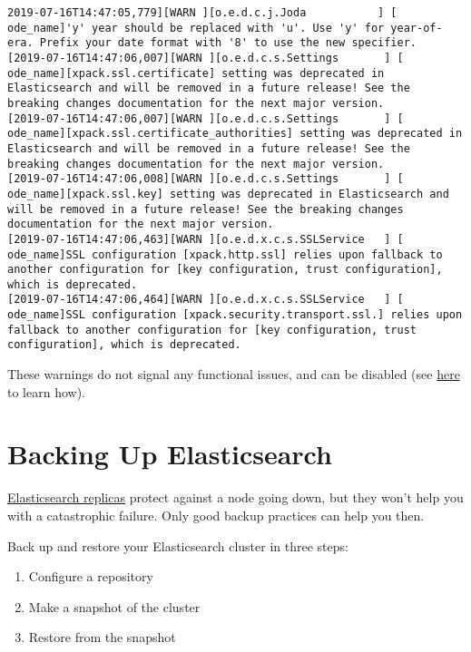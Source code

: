 \begin{verbatim}
2019-07-16T14:47:05,779][WARN ][o.e.d.c.j.Joda           ] [
ode_name]'y' year should be replaced with 'u'. Use 'y' for year-of-era. Prefix your date format with '8' to use the new specifier.
[2019-07-16T14:47:06,007][WARN ][o.e.d.c.s.Settings       ] [
ode_name][xpack.ssl.certificate] setting was deprecated in Elasticsearch and will be removed in a future release! See the breaking changes documentation for the next major version.
[2019-07-16T14:47:06,007][WARN ][o.e.d.c.s.Settings       ] [
ode_name][xpack.ssl.certificate_authorities] setting was deprecated in Elasticsearch and will be removed in a future release! See the breaking changes documentation for the next major version.
[2019-07-16T14:47:06,008][WARN ][o.e.d.c.s.Settings       ] [
ode_name][xpack.ssl.key] setting was deprecated in Elasticsearch and will be removed in a future release! See the breaking changes documentation for the next major version.
[2019-07-16T14:47:06,463][WARN ][o.e.d.x.c.s.SSLService   ] [
ode_name]SSL configuration [xpack.http.ssl] relies upon fallback to another configuration for [key configuration, trust configuration], which is deprecated.
[2019-07-16T14:47:06,464][WARN ][o.e.d.x.c.s.SSLService   ] [
ode_name]SSL configuration [xpack.security.transport.ssl.] relies upon fallback to another configuration for [key configuration, trust configuration], which is deprecated.
\end{verbatim}

These warnings do not signal any functional issues, and can be disabled
(see
\href{https://www.elastic.co/guide/en/elasticsearch/reference/7.x/logging.html\#deprecation-logging}{here}
to learn how).

\chapter{Backing Up Elasticsearch}\label{backing-up-elasticsearch}

\href{https://www.elastic.co/guide/en/elasticsearch/reference/7.x/index-modules.html\#index-modules-settings}{Elasticsearch
replicas} protect against a node going down, but they won't help you
with a catastrophic failure. Only good backup practices can help you
then.

Back up and restore your Elasticsearch cluster in three steps:

\begin{enumerate}
\def\labelenumi{\arabic{enumi}.}
\item
  Configure a repository
\item
  Make a snapshot of the cluster
\item
  Restore from the snapshot
\end{enumerate}

